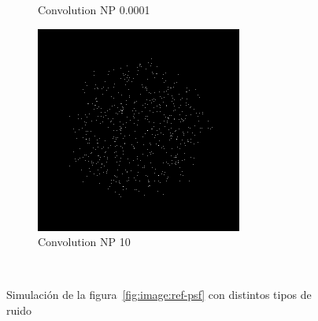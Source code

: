 \documentclass{./packages/optica-article}
\begin{document}
\begin{figure}[hbp]
\begin{center}
\begin{subfigure}[t]{0.25\textwidth}
			\caption{Convolution NP 0.0001}
		\end{subfigure}
		\hfill
		\begin{subfigure}[t]{0.25\textwidth}\centering
			\centering
			\includegraphics[width=\textwidth]{Simulation deconvolution/ref_np_10}
			\caption{Convolution NP 10}
		\end{subfigure}
		\hfill\,
		\caption{Simulación de la figura~\ref{fig:image:ref-psf} con distintos tipos de ruido}\label{fig:convolutions}
	\end{center}
\end{figure}
\end{document}
